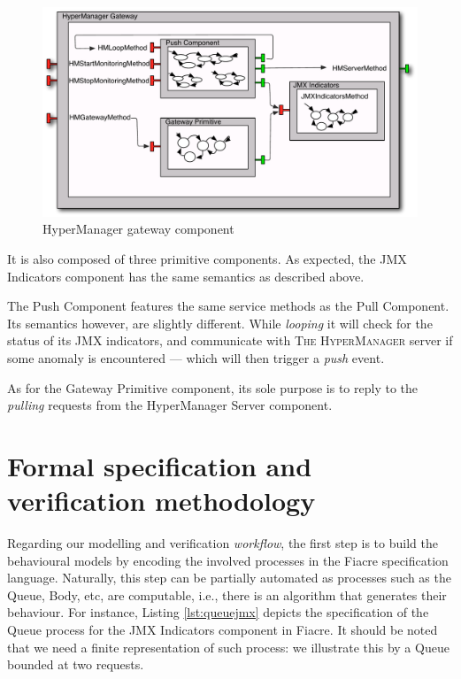 	
	\begin{figure}[H]
		\centering
		\includegraphics[scale=0.45]{figures/chapter3/HMGateway-comp-v2.pdf}
		\caption{HyperManager gateway component}
		\label{fig:HMGw}		
	\end{figure}		
	
	
	\noindent It is also composed of three primitive components. As expected, the \textsf{JMX Indicators} component has the same semantics as
	described above. 
	
	The \textsf{Push Component} features the same service methods as the \textsf{Pull Component}. Its semantics however, are slightly different.
	While \textit{looping} it will check for the status of its \ac{JMX} indicators, and communicate with  \textsc{The HyperManager} server if some anomaly
	is encountered --- which will then trigger a \textit{push} event.
	
	As for the \textsf{Gateway Primitive} component, its sole purpose is to reply to the \textit{pulling} requests from 
	the \textsf{HyperManager Server} component.
	

\section{Formal specification and verification methodology}		
\label{sec:methodology}		
		
		
			Regarding our modelling and verification \textit{workflow}, the first step is to build 
		the behavioural models by encoding the involved processes in the \textsf{Fiacre} specification 
		language. Naturally, this step can be partially automated as processes such as the \textsf{Queue},
		\textsf{Body}, etc, are computable, i.e., there is an algorithm that generates their behaviour. For instance,
		Listing \ref{lst:queuejmx} depicts the specification of the \textsf{Queue} process for the \textsf{JMX Indicators} 
		component in \textsf{Fiacre}. It should be noted that we need a finite representation of such process: 
		we illustrate this by a \textsf{Queue} bounded at two requests.
		
